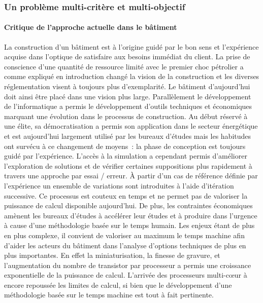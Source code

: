 

\subsubsection{Un problème multi-critère et multi-objectif} %
\label{ssub:un_probleme_multi_critere_et_multi_objectif}

\paragraph{Critique de l’approche actuelle dans le bâtiment} %
\label{par:critique_de_l_approche_actuelle_dans_le_batiment}
La construction d’un bâtiment est à l’origine guidé par le bon sens et l’expérience
acquise dans l’optique de satisfaire aux besoins immédiat du client. La prise
de conscience d’une quantité de ressource limité avec le premier choc pétrolier
a comme expliqué en introduction changé la vision de la construction et les diverses
réglementation visent à toujours plus d’exemplarité. Le bâtiment d’aujourd’hui doit
ainsi être placé dans une vision plus large.
Parallèlement le développement de l’informatique a permis le développement d’outils
techniques et économiques marquant une évolution dans le processus de construction.
Au début réservé à une élite, sa démocratisation a permis son application dans le secteur
énergétique et est aujourd’hui largement utilisé par les bureaux d’études mais
les habitudes ont survécu à ce changement de moyens~: la phase de conception est toujours
guidé par l’expérience. L’accès à la simulation a cependant permis d’améliorer
l’exploration de solutions et de vérifier certaines suppositions plus rapidement
à travers une approche par essai / erreur. À partir d’un cas de référence définie
par l’expérience un ensemble de variations sont introduites à l’aide d’itération
successive. Ce processus est couteux en temps et ne permet pas de valoriser la puissance
de calcul disponible aujourd’hui. De plus, les contraintes économiques amènent les bureaux
d’études à accélérer leur études et à produire dans l’urgence à cause d’une méthodologie
basée sur le temps humain.
Les enjeux étant de plus en plus complexe, il convient de valoriser au maximum le
temps machine afin d’aider les acteurs du bâtiment dans l’analyse d’options techniques
de plus en plus importantes.
En effet la miniaturisation, la finesse de gravure,
et l’augmentation du nombre de transistor par processeur a permis une croissance
exponentielle de la puissance de calcul. L’arrivée des processeurs multi-cœur à encore
repoussée les limites de calcul, si bien que le développement d’une méthodologie basée
sur le temps machine est tout à fait pertinente.

